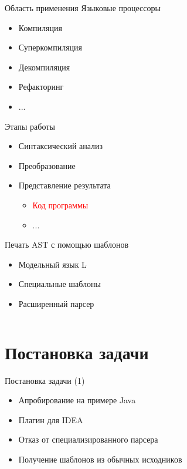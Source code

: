 \documentclass[sans]{beamer}
\begin{document}
\begin{frame}{Область применения}
	Языковые процессоры
	\begin{itemize}
		\item Компиляция
		\item Суперкомпиляция
		\item Декомпиляция
		\item Рефакторинг
		\item ...
	\end{itemize}
	\vspace{0.5cm}
	Этапы работы
	\begin{itemize}
		\item Синтаксический анализ
		\item Преобразование
		\item Представление результата
		\begin{itemize}
			\item \textcolor{red}{Код программы}
			\item ...
		\end{itemize}
	\end{itemize}
\end{frame}

\begin{frame}{Печать AST с помощью шаблонов}
	\begin{itemize}
		\item Модельный язык L
		\item Специальные шаблоны
		\item Расширенный парсер
	\end{itemize}
	\begin{block}{}
		\inputminted{pascal}{codes/l_write.t}
	\end{block}
\end{frame}

\section{Постановка задачи}

\begin{frame}{Постановка задачи (1)}
	\begin{itemize}
		\item Апробирование на примере Java
		\item Плагин для IDEA
	\end{itemize}
	\begin{itemize}
		\item Отказ от специализированного парсера
		\item Получение шаблонов из обычных исходников
	\end{itemize}
\end{frame}
\end{document}
